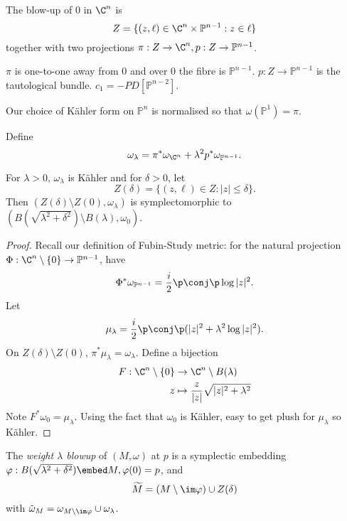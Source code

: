 \documentclass[a4paper]{article}
\renewcommand*{\P}{\mathbb{P}}
\begin{document}
\begin{definition}[blow-up]
  The blow-up of \(0\) in \(\C^n\) is
  \[
    Z = \{(z, \ell) \in \C^n \times \P^{n - 1}: z \in \ell\}
  \]
  together with two projections \(\pi: Z \to \C^n, p: Z \to \P^{n - 1}\).
\end{definition}

\(\pi\) is one-to-one away from \(0\) and over \(0\) the fibre is \(\P^{n - 1}\). \(p: Z \to \P^{n - 1}\) is the tautological bundle. \(c_1 = - PD[\P^{n - 2}]\).

\begin{note}
  Our choice of Kähler form on \(\P^n\) is normalised so that \(\omega(\P^1) = \pi\).
\end{note}

Define
\[
  \omega_\lambda = \pi^* \omega_{\C^n} + \lambda^2 p^* \omega_{\P^{n - 1}}.
\]

\begin{lemma}
  For \(\lambda > 0\), \(\omega_\lambda\) is Kähler and for \(\delta > 0\), let
  \[
    Z(\delta) = \{(z, \ell) \in Z: |z| \leq \delta\}.
  \]
  Then \((Z(\delta) \setminus Z(0), \omega_\lambda)\) is symplectomorphic to \((B(\sqrt{\lambda^2 + \delta^2}) \setminus B(\lambda), \omega_0)\).
\end{lemma}

\begin{proof}
  Recall our definition of Fubin-Study metric: for the natural projection \(\Phi: \C^n \setminus \{0\} \to \P^{n - 1}\), have
  \[
    \Phi^*\omega_{\P^{n - 1}} = \frac{i}{2} \p \conj \p \log |z|^2.
  \]
  Let
  \[
    \mu_\lambda = \frac{i}{2} \p \conj \p (|z|^2 + \lambda^2 \log |z|^2).
  \]
  On \(Z(\delta) \setminus Z(0)\), \(\pi^* \mu_\lambda = \omega_\lambda\). Define a bijection
  \begin{align*}
    F: \C^n\setminus \{0\} &\to \C^n\setminus B(\lambda) \\
    z &\mapsto \frac{z}{|z|} \sqrt{|z|^2 + \lambda^2}
  \end{align*}
  Note \(F^*\omega_0 = \mu_\lambda\). Using the fact that \(\omega_0\) is Kähler, easy to get plush for \(\mu_\lambda\) so Kähler.
\end{proof}

\begin{definition}[blowup]
  The \emph{weight \(\lambda\) blowup} of \((M, \omega)\) at \(p\) is a symplectic embedding \(\varphi: B(\sqrt{\lambda^2 + \delta^2}) \embed M, \varphi(0) = p\), and
  \[
    \widetilde M = (M \setminus \im \varphi) \cup Z(\delta)
  \]
  with \(\tilde \omega_M = \omega_{M \setminus \im \varphi} \cup \omega_\lambda\).
\end{definition}
\end{document}
